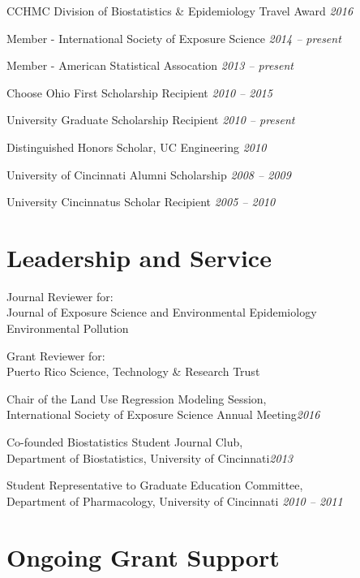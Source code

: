 \documentclass[margin,line]{res}
\newenvironment{list3}{
  \begin{list}{}{%
      \setlength{\itemsep}{0in}
      \setlength{\parsep}{0in} \setlength{\parskip}{0in}
      \setlength{\topsep}{0in} \setlength{\partopsep}{0in} 
      \setlength{\leftmargin}{0in}}}{\end{list}}
\begin{document}
\begin{resume}
\begin{list3} \itemsep 4pt
\item[] CCHMC Division of Biostatistics \& Epidemiology Travel Award \hfill \textit{2016}
\item[] Member - International Society of Exposure Science \hfill \textit{2014 -- present}
\item[] Member - American Statistical Assocation \hfill \textit{2013 -- present}
\item[] Choose Ohio First Scholarship Recipient \hfill \textit{2010 -- 2015}
\item[] University Graduate Scholarship Recipient \hfill \textit{2010 -- present}
\item[] Distinguished Honors Scholar, UC Engineering \hfill \textit{2010}
\item[] University of Cincinnati Alumni Scholarship \hfill \textit{2008 -- 2009}
\item[] University Cincinnatus Scholar Recipient \hfill \textit{2005 -- 2010}
\end{list3}


\section{\sc Leadership and Service}
\begin{list3} \itemsep 4pt
\item[] Journal Reviewer for: \\
        Journal of Exposure Science and Environmental Epidemiology \\
        Environmental Pollution
\item[] Grant Reviewer for: \\
        Puerto Rico Science, Technology \& Research Trust
\item[] Chair of the Land Use Regression Modeling Session, \\International Society of Exposure Science Annual Meeting\hfill \textit{2016}
\item[] Co-founded Biostatistics Student Journal Club, \\Department of Biostatistics, University of Cincinnati\hfill \textit{2013}
\item[] Student Representative to Graduate Education Committee, \\Department of Pharmacology, University of Cincinnati \hfill \textit{2010 -- 2011}
\end{list3}

\section{\sc Ongoing Grant Support}


\end{resume}
\end{document}
